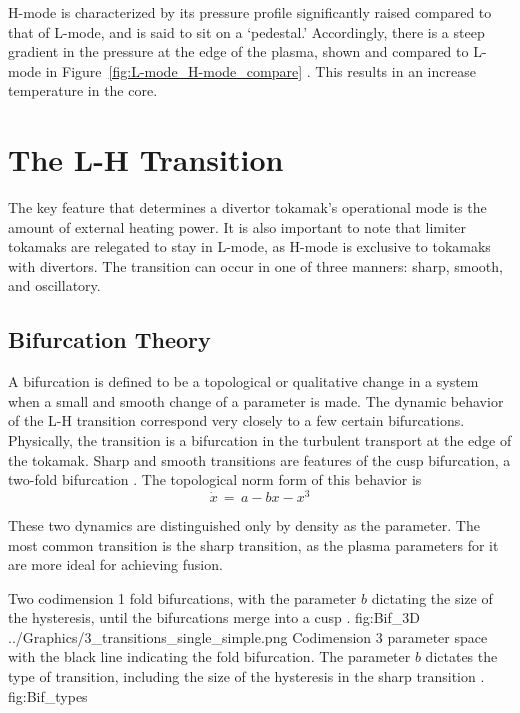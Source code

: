 H-mode is characterized by its pressure profile significantly raised compared to that of L-mode, and is said to sit on a `pedestal.'
Accordingly, there is a steep gradient in the pressure at the edge of the plasma, shown and compared to L-mode in Figure~\ref{fig:L-mode_H-mode_compare} \cite{weymiens_bifurcation_2014}.
This results in an increase temperature in the core.

\section{The L-H Transition}
The key feature that determines a divertor tokamak's operational mode is the amount of external heating power.
It is also important to note that limiter tokamaks are relegated to stay in L-mode, as H-mode is exclusive to tokamaks with divertors.
The transition can occur in one of three manners: sharp, smooth, and oscillatory.

\subsection{Bifurcation Theory}
A bifurcation is defined to be a topological or qualitative change in a system when a small and smooth change of a parameter is made.
The dynamic behavior of the L-H transition correspond very closely to a few certain bifurcations.
Physically, the transition is a bifurcation in the turbulent transport at the edge of the tokamak.
Sharp and smooth transitions are features of the cusp bifurcation, a two-fold bifurcation \cite{weymiens_bifurcation_2014}. 
The topological norm form of this behavior is
\begin{equation}
	\dot{x} \,=\, a - bx - x^3
	\label{eq:sharp_bif}
\end{equation}

These two dynamics are distinguished only by density as the parameter.
The most common transition is the sharp transition, as the plasma parameters for it are more ideal for achieving fusion.

	{Two codimension 1 fold bifurcations, with the parameter $b$ dictating the size of the hysteresis, until the bifurcations merge into a cusp \cite{weymiens_bifurcation_2014}.}
	{fig:Bif_3D}
	{../Graphics/3_transitions_single_simple.png}
	{Codimension 3 parameter space with the black line indicating the fold bifurcation. The parameter $b$ dictates the type of transition, including the size of the hysteresis in the sharp transition \cite{weymiens_bifurcation_2014}.}
	{fig:Bif_types}

